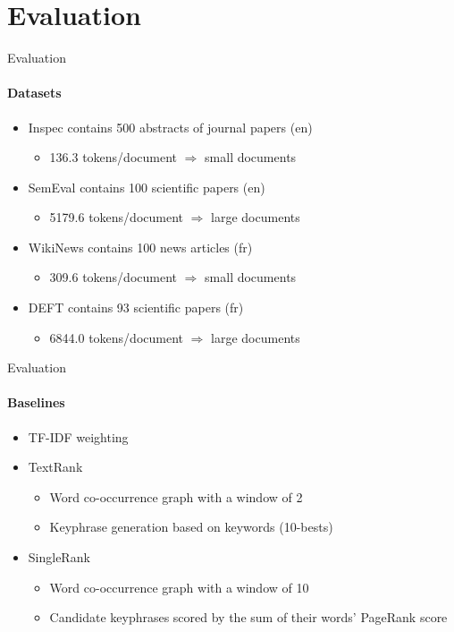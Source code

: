 \section{Evaluation}
  \begin{frame}{Evaluation}
    \framesubtitle{Datasets}

    \begin{itemize}
      \item<+->{Inspec contains 500 abstracts of journal papers (en)}
      \begin{itemize}
        \item{136.3 tokens/document $\Rightarrow$ small documents}
      \end{itemize}
      \item<+->{SemEval contains 100 scientific papers (en)}
      \begin{itemize}
        \item{5179.6 tokens/document $\Rightarrow$ large documents}
      \end{itemize}
      \item<+->{WikiNews contains 100 news articles (fr)}
      \begin{itemize}
        \item{309.6 tokens/document $\Rightarrow$ small documents}
      \end{itemize}
      \item<+->{DEFT contains 93 scientific papers (fr)}
      \begin{itemize}
        \item{6844.0 tokens/document $\Rightarrow$ large documents}
      \end{itemize}
    \end{itemize}
  \end{frame}

  \begin{frame}{Evaluation}
    \framesubtitle{Baselines}

    \begin{itemize}
      \item<+->{TF-IDF weighting}
      \item<+->{TextRank}
      \begin{itemize}
        \item{Word co-occurrence graph with a window of 2}
        \item{Keyphrase generation based on keywords (10-bests)}
      \end{itemize}
      \item<+->{SingleRank}
      \begin{itemize}
        \item{Word co-occurrence graph with a window of 10}
        \item{Candidate keyphrases scored by the sum of their words' PageRank score}
      \end{itemize}
    \end{itemize}
  \end{frame}

